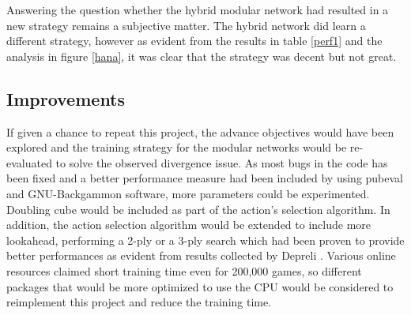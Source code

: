 \documentclass[12pt,a4paper]{article}
\begin{document}
Answering the question whether the hybrid modular network had resulted in a new strategy remains a subjective matter. The hybrid network did learn a different strategy, however as evident from the results in table \ref{perf1} and the analysis in figure \ref{hana}, it was clear that the strategy was decent but not great. 

\subsection{Improvements}
If given a chance to repeat this project, the advance objectives would have been explored and the training strategy for the modular networks would be re-evaluated to solve the observed divergence issue. As most bugs in the code has been fixed and a better performance measure had been included by using pubeval and GNU-Backgammon software, more parameters could be experimented. Doubling cube would be included as part of the action’s selection algorithm. In addition, the action selection algorithm would be extended to include more lookahead, performing a 2-ply or a 3-ply search which had been proven to provide better performances as evident from results collected by Depreli \citeyear{botbattle}. Various online resources claimed short training time even for 200,000 games, so different packages that would be more optimized to use the CPU would be considered to reimplement this project and reduce the training time.
\end{document}
